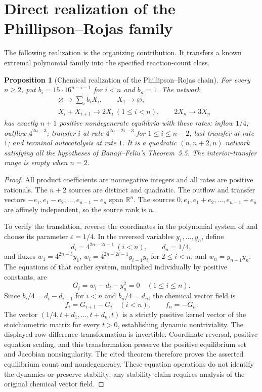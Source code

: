 \documentclass[11pt]{article}
\newtheorem{proposition}{Proposition}
\newcommand{\R}{\mathbb R}
\newcommand{\zero}{\varnothing}
\begin{document}
\section{Direct realization of the Phillipson--Rojas family}\label{sec:PR}
The following realization is the organizing contribution. It transfers a known extremal polynomial family into the specified reaction-count class.
\begin{proposition}[Chemical realization of the Phillipson--Rojas chain]\label{prop:PR}
For every $n\geq2$, put $b_i=15\cdot16^{n-i-1}$ for $i<n$ and $b_n=1$. The network
\[
\begin{aligned}
&\zero\longrightarrow\sum_i b_iX_i,\qquad X_1\longrightarrow\zero,\\
&X_i+X_{i+1}\longrightarrow2X_i\ (1\leq i<n),\qquad
2X_n\longrightarrow3X_n
\end{aligned}
\]
has exactly $n+1$ positive nondegenerate equilibria with these rates: inflow $1/4$; outflow $4^{2n-3}$; transfer $i$ at rate $4^{2n-2i-3}$ for $1\leq i\leq n-2$; last transfer at rate $1$; and terminal autocatalysis at rate $1$. It is a quadratic $(n,n+2,n)$ network satisfying all the hypotheses of Banaji--Feliu's Theorem~5.5. The interior-transfer range is empty when $n=2$.
\end{proposition}
\begin{proof}
All product coefficients are nonnegative integers and all rates are positive rationals. The $n+2$ sources are distinct and quadratic. The outflow and transfer vectors $-e_1,e_1-e_2,\ldots,e_{n-1}-e_n$ span $\R^n$. The sources $0,e_1,e_1+e_2,\ldots,e_{n-1}+e_n$ are affinely independent, so the source rank is $n$.

To verify the translation, reverse the coordinates in the polynomial system of \cite[Theorem 1.6]{PR} and choose its parameter $\varepsilon=1/4$. In the reversed variables $y_1,\ldots,y_n$, define
\[
d_i=4^{2n-2i-1}\ (i<n),\qquad d_n=1/4,
\]
and fluxes $w_1=4^{2n-3}y_1$, $w_i=4^{2n-2i-1}y_{i-1}y_i$ for $2\leq i<n$, and $w_n=y_{n-1}y_n$. The equations of that earlier system, multiplied individually by positive constants, are
\[
G_i=w_i-d_i-y_n^2=0\quad(1\leq i\leq n).
\]
Since $b_i/4=d_i-d_{i+1}$ for $i<n$ and $b_n/4=d_n$, the chemical vector field is
\[
f_i=G_{i+1}-G_i\quad(i<n),\qquad f_n=-G_n.
\]
The vector $(1/4,t+d_1,\ldots,t+d_n,t)$ is a strictly positive kernel vector of the stoichiometric matrix for every $t>0$, establishing dynamic nontriviality. The displayed row-difference transformation is invertible. Coordinate reversal, positive equation scaling, and this transformation preserve the positive equilibrium set and Jacobian nonsingularity. The cited theorem therefore proves the asserted equilibrium count and nondegeneracy. These equation operations do not identify the dynamics or preserve stability; any stability claim requires analysis of the original chemical vector field.
\end{proof}
\end{document}
